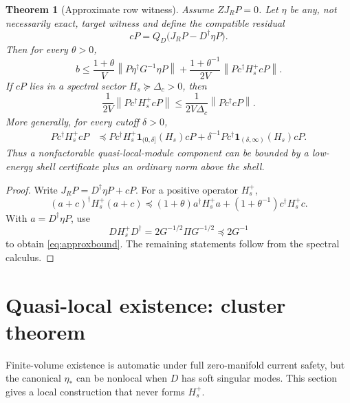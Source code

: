 \documentclass[11pt]{article}
\newtheorem{theorem}{Theorem}[section]
\theoremstyle{definition}
\theoremstyle{remark}
\newcommand{\norm}[1]{\left\lVert #1\right\rVert}
\begin{document}
\begin{theorem}[Approximate row witness]
\label{thm:approx}
Assume $ZJ_RP=0$.  Let $\eta$ be any, not necessarily exact, target witness and define the compatible residual
\begin{equation}
 cP=Q_D\bigl(J_RP-D^\dagger\eta P\bigr).
 \label{eq:cdef}
\end{equation}
Then for every $\theta>0$,
\begin{equation}
 \boxed{
 b\le
 \frac{1+\theta}{V}\norm{P\eta^\dagger G^{-1}\eta P}
 +\frac{1+\theta^{-1}}{2V}
 \norm{Pc^\dagger H_s^+cP}.}
 \label{eq:approxbound}
\end{equation}
If $cP$ lies in a spectral sector $H_s\succeq\Delta_c>0$, then
\begin{equation}
 \frac1{2V}\norm{Pc^\dagger H_s^+cP}
 \le\frac1{2V\Delta_c}\norm{Pc^\dagger cP}.
 \label{eq:gapc}
\end{equation}
More generally, for every cutoff $\delta>0$,
\begin{align}
 Pc^\dagger H_s^+cP
 &\preceq
 Pc^\dagger H_s^+\mathbf1_{(0,\delta]}(H_s)cP
 +\delta^{-1}Pc^\dagger\mathbf1_{(\delta,\infty)}(H_s)cP.
 \label{eq:shellsplit}
\end{align}
Thus a nonfactorable quasi-local-module component can be bounded by a low-energy shell certificate plus an ordinary norm above the shell.
\end{theorem}

\begin{proof}
Write $J_RP=D^\dagger\eta P+cP$.  For a positive operator $H_s^+$,
\[
 (a+c)^\dagger H_s^+(a+c)
 \preceq(1+\theta)a^\dagger H_s^+a
 +(1+\theta^{-1})c^\dagger H_s^+c.
\]
With $a=D^\dagger\eta P$, use
\begin{equation}
 DH_s^+D^\dagger
 =2G^{-1/2}\Pi G^{-1/2}
 \preceq2G^{-1}
 \label{eq:DHplusD}
\end{equation}
to obtain \eqref{eq:approxbound}.  The remaining statements follow from the spectral calculus.
\end{proof}

\section{Quasi-local existence: cluster theorem}

Finite-volume existence is automatic under full zero-manifold current safety, but the canonical $\eta_*$ can be nonlocal when $D$ has soft singular modes.  This section gives a local construction that never forms $H_s^+$.
\end{document}
